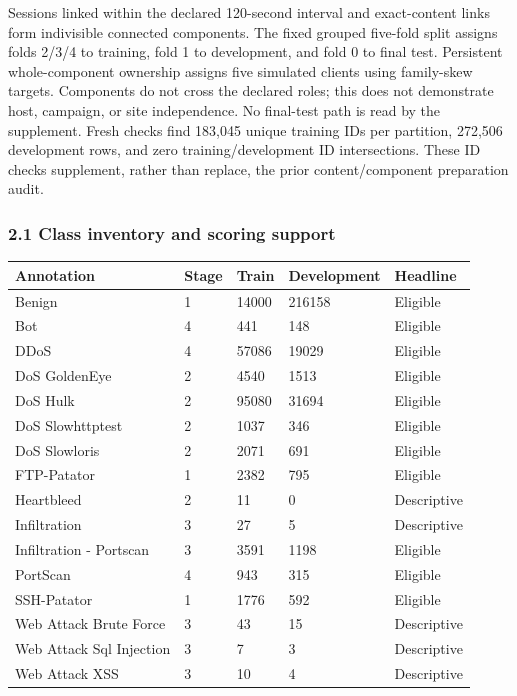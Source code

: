 \documentclass[
  10pt,
  a4paper,
]{article}
\begin{document}
Sessions linked within the declared 120-second interval and
exact-content links form indivisible connected components. The fixed
grouped five-fold split assigns folds 2/3/4 to training, fold 1 to
development, and fold 0 to final test. Persistent whole-component
ownership assigns five simulated clients using family-skew targets.
Components do not cross the declared roles; this does not demonstrate
host, campaign, or site independence. No final-test path is read by the
supplement. Fresh checks find 183,045 unique training IDs per partition,
272,506 development rows, and zero training/development ID
intersections. These ID checks supplement, rather than replace, the
prior content/component preparation audit.

\hypertarget{class-inventory-and-scoring-support}{%
\subsubsection{2.1 Class inventory and scoring
support}\label{class-inventory-and-scoring-support}}

\begin{longtable}[]{@{}lllll@{}}
\toprule
Annotation & Stage & Train & Development & Headline \\
\midrule
\endhead
Benign & 1 & 14000 & 216158 & Eligible \\
Bot & 4 & 441 & 148 & Eligible \\
DDoS & 4 & 57086 & 19029 & Eligible \\
DoS GoldenEye & 2 & 4540 & 1513 & Eligible \\
DoS Hulk & 2 & 95080 & 31694 & Eligible \\
DoS Slowhttptest & 2 & 1037 & 346 & Eligible \\
DoS Slowloris & 2 & 2071 & 691 & Eligible \\
FTP-Patator & 1 & 2382 & 795 & Eligible \\
Heartbleed & 2 & 11 & 0 & Descriptive \\
Infiltration & 3 & 27 & 5 & Descriptive \\
Infiltration - Portscan & 3 & 3591 & 1198 & Eligible \\
PortScan & 4 & 943 & 315 & Eligible \\
SSH-Patator & 1 & 1776 & 592 & Eligible \\
Web Attack Brute Force & 3 & 43 & 15 & Descriptive \\
Web Attack Sql Injection & 3 & 7 & 3 & Descriptive \\
Web Attack XSS & 3 & 10 & 4 & Descriptive \\
\bottomrule
\end{longtable}
\end{document}

